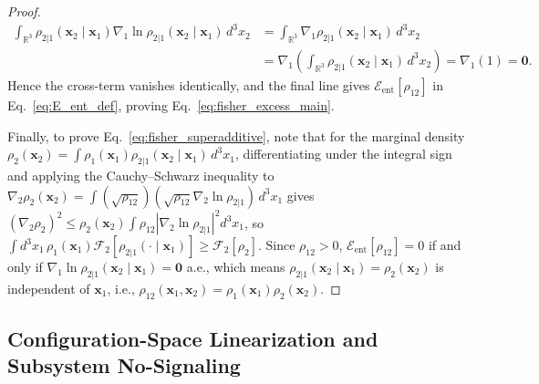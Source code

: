 \documentclass[11pt, a4paper]{article}
\theoremstyle{definition}
\begin{document}
\begin{proof}
\begin{equation}
\label{eq:score_zero}
\begin{aligned}
\int_{\mathbb{R}^3} \rho_{2|1}(\mathbf{x}_2 \mid \mathbf{x}_1)\nabla_1 \ln\rho_{2|1}(\mathbf{x}_2 \mid \mathbf{x}_1)\,d^3x_2 &= \int_{\mathbb{R}^3} \nabla_1 \rho_{2|1}(\mathbf{x}_2 \mid \mathbf{x}_1)\,d^3x_2 \\
&= \nabla_1 \left(\int_{\mathbb{R}^3} \rho_{2|1}(\mathbf{x}_2 \mid \mathbf{x}_1)\,d^3x_2\right) = \nabla_1(1) = \mathbf{0}.
\end{aligned}
\end{equation}
Hence the cross-term vanishes identically, and the final line gives $\mathcal{E}_{\text{ent}}[\rho_{12}]$ in Eq.~\eqref{eq:E_ent_def}, proving Eq.~\eqref{eq:fisher_excess_main}.

Finally, to prove Eq.~\eqref{eq:fisher_superadditive}, note that for the marginal density $\rho_2(\mathbf{x}_2) = \int \rho_1(\mathbf{x}_1)\rho_{2|1}(\mathbf{x}_2 \mid \mathbf{x}_1)\,d^3x_1$, differentiating under the integral sign and applying the Cauchy--Schwarz inequality to $\nabla_2 \rho_2(\mathbf{x}_2) = \int (\sqrt{\rho_{12}})(\sqrt{\rho_{12}}\nabla_2 \ln\rho_{2|1})\,d^3x_1$ gives $(\nabla_2 \rho_2)^2 \le \rho_2(\mathbf{x}_2)\int \rho_{12}|\nabla_2 \ln\rho_{2|1}|^2 d^3x_1$, so $\int d^3x_1\,\rho_1(\mathbf{x}_1)\mathcal{F}_2[\rho_{2|1}(\cdot \mid \mathbf{x}_1)] \ge \mathcal{F}_2[\rho_2]$. Since $\rho_{12} > 0$, $\mathcal{E}_{\text{ent}}[\rho_{12}] = 0$ if and only if $\nabla_1 \ln\rho_{2|1}(\mathbf{x}_2 \mid \mathbf{x}_1) = \mathbf{0}$ a.e., which means $\rho_{2|1}(\mathbf{x}_2 \mid \mathbf{x}_1) = \rho_2(\mathbf{x}_2)$ is independent of $\mathbf{x}_1$, i.e., $\rho_{12}(\mathbf{x}_1, \mathbf{x}_2) = \rho_1(\mathbf{x}_1)\rho_2(\mathbf{x}_2)$.
\end{proof}

\subsection{Configuration-Space Linearization and Subsystem No-Signaling}
\end{document}
